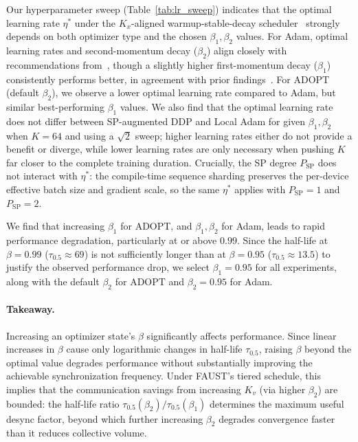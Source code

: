 \documentclass{article}
\begin{document}
Our hyperparameter sweep (Table~\ref{tab:lr_sweep}) indicates that the optimal learning rate $\eta^*$ under the $K_x$-aligned warmup-stable-decay scheduler~\citep{hagele2024scaling} strongly depends on both optimizer type and the chosen $\beta_1, \beta_2$ values. For Adam, optimal learning rates and second-momentum decay ($\beta_2$) align closely with recommendations from~\citet{allal2025smollm2}, though a slightly higher first-momentum decay ($\beta_1$) consistently performs better, in agreement with prior findings~\citep{merrill2025criticalbatchsizerevisited}. For ADOPT (default $\beta_2$), we observe a lower optimal learning rate compared to Adam, but similar best-performing $\beta_1$ values. We also find that the optimal learning rate does not differ between SP-augmented DDP and Local Adam for given $\beta_1, \beta_2$ when $K = 64$ and using a $\sqrt{2}$ sweep; higher learning rates either do not provide a benefit or diverge, while lower learning rates are only necessary when pushing $K$ far closer to the complete training duration. Crucially, the SP degree $P_{\text{SP}}$ does not interact with $\eta^*$: the compile-time sequence sharding preserves the per-device effective batch size and gradient scale, so the same $\eta^*$ applies with $P_{\text{SP}} = 1$ and $P_{\text{SP}} = 2$.

We find that increasing $\beta_1$ for ADOPT, and $\beta_1, \beta_2$ for Adam, leads to rapid performance degradation, particularly at or above $0.99$. Since the half-life at $\beta = 0.99$ ($\tau_{0.5} \approx 69$) is not sufficiently longer than at $\beta = 0.95$ ($\tau_{0.5} \approx 13.5$) to justify the observed performance drop, we select $\beta_1 = 0.95$ for all experiments, along with the default $\beta_2$ for ADOPT and $\beta_2 = 0.95$ for Adam.

\paragraph{Takeaway.} Increasing an optimizer state's $\beta$ significantly affects performance. Since linear increases in $\beta$ cause only logarithmic changes in half-life $\tau_{0.5}$, raising $\beta$ beyond the optimal value degrades performance without substantially improving the achievable synchronization frequency. Under FAUST's tiered schedule, this implies that the communication savings from increasing $K_v$ (via higher $\beta_2$) are bounded: the half-life ratio $\tau_{0.5}(\beta_2) / \tau_{0.5}(\beta_1)$ determines the maximum useful desync factor, beyond which further increasing $\beta_2$ degrades convergence faster than it reduces collective volume.
\end{document}
